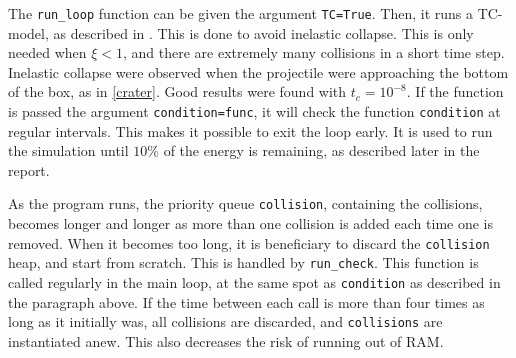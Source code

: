 \documentclass{article}
\begin{document}
    
    The \verb|run_loop| function can be given the argument \verb|TC=True|.
    Then, it runs a TC-model, as described in \cite{TC}.
    This is done to avoid inelastic collapse.
    This is only needed when $\xi<1$, and there are extremely many collisions in a short time step.
    Inelastic collapse were observed when the projectile were approaching the bottom of the box, as in \autoref{crater}.
    Good results were found with $t_c = 10^{-8}$.
    If the function is passed the argument \verb|condition=func|, it will check the function \verb|condition| at regular intervals.
    This makes it possible to exit the loop early.
    It is used to run the simulation until $10\%$ of the energy is remaining, as described later in the report.

    As the program runs, the priority queue \verb|collision|, containing the collisions, becomes longer and longer as more than one collision is added each time one is removed.
    When it becomes too long, it is beneficiary to discard the \verb|collision| heap, and start from scratch.
    This is handled by \verb|run_check|.
    This function is called regularly in the main loop, at the same spot as \verb|condition| as described in the paragraph above.
    If the time between each call is more than four times as long as it initially was, all collisions are discarded, and \verb|collisions| are instantiated anew.
    This also decreases the risk of running out of RAM.
\end{document}
